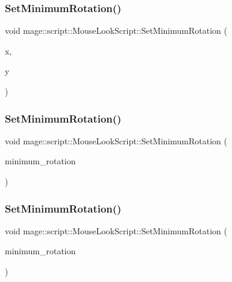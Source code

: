 \subsubsection{\texorpdfstring{Set\+Minimum\+Rotation()}{SetMinimumRotation()}\hspace{0.1cm}{\footnotesize\ttfamily [1/4]}}
{\footnotesize\ttfamily void mage\+::script\+::\+Mouse\+Look\+Script\+::\+Set\+Minimum\+Rotation (\begin{DoxyParamCaption}\item[{\hyperlink{namespacemage_aa97e833b45f06d60a0a9c4fc22ae02c0}{F32}}]{x,  }\item[{\hyperlink{namespacemage_aa97e833b45f06d60a0a9c4fc22ae02c0}{F32}}]{y }\end{DoxyParamCaption})\hspace{0.3cm}{\ttfamily [noexcept]}}

\hypertarget{classmage_1_1script_1_1_mouse_look_script_a8d09e8b8f05b3aaf7973e5ce4ff22a82}{}\label{classmage_1_1script_1_1_mouse_look_script_a8d09e8b8f05b3aaf7973e5ce4ff22a82} 
\subsubsection{\texorpdfstring{Set\+Minimum\+Rotation()}{SetMinimumRotation()}\hspace{0.1cm}{\footnotesize\ttfamily [2/4]}}
{\footnotesize\ttfamily void mage\+::script\+::\+Mouse\+Look\+Script\+::\+Set\+Minimum\+Rotation (\begin{DoxyParamCaption}\item[{const X\+M\+F\+L\+O\+A\+T2 \&}]{minimum\+\_\+rotation }\end{DoxyParamCaption})\hspace{0.3cm}{\ttfamily [noexcept]}}

\hypertarget{classmage_1_1script_1_1_mouse_look_script_a8748be9ee6bc6b0606c678a1d48ae190}{}\label{classmage_1_1script_1_1_mouse_look_script_a8748be9ee6bc6b0606c678a1d48ae190} 
\subsubsection{\texorpdfstring{Set\+Minimum\+Rotation()}{SetMinimumRotation()}\hspace{0.1cm}{\footnotesize\ttfamily [3/4]}}
{\footnotesize\ttfamily void mage\+::script\+::\+Mouse\+Look\+Script\+::\+Set\+Minimum\+Rotation (\begin{DoxyParamCaption}\item[{X\+M\+F\+L\+O\+A\+T2 \&\&}]{minimum\+\_\+rotation }\end{DoxyParamCaption})\hspace{0.3cm}{\ttfamily [noexcept]}}

